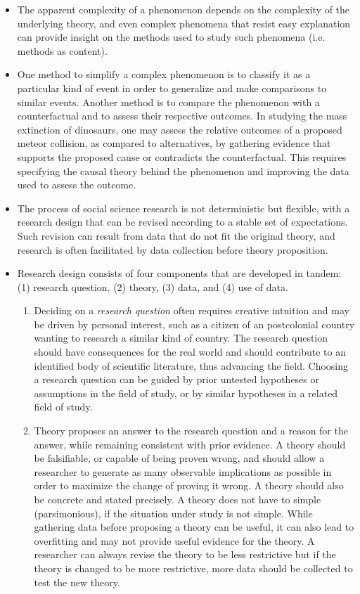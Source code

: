 \documentclass[11pt,letterpaper]{article}
\begin{document}
\begin{itemize}
\begin{enumerate}
\end{enumerate}
\item The apparent complexity of a phenomenon depends on the complexity of the underlying theory, and even complex phenomena that resist easy explanation can provide insight on the methods used to study such phenomena (i.e. methods as content). 
\item One method to simplify a complex phenomenon is to classify it as a particular kind of event in order to generalize and make comparisons to similar events. Another method is to compare the phenomenon with a counterfactual and to assess their respective outcomes. In studying the mass extinction of dinosaurs, one may assess the relative outcomes of a proposed meteor collision, as compared to alternatives, by gathering evidence that supports the proposed cause or contradicts the counterfactual. This requires specifying the causal theory behind the phenomenon and improving the data used to assess the outcome. 
\item The process of social science research is not deterministic but flexible, with a research design that can be revised according to a stable set of expectations. Such revision can result from data that do not fit the original theory, and research is often facilitated by data collection before theory proposition.
\item Research design consists of four components that are developed in tandem: (1) research question, (2) theory, (3) data, and (4) use of data.
\begin{enumerate}
\item Deciding on a \emph{research question} often requires creative intuition and may be driven by personal interest, such as a citizen of an postcolonial country wanting to research a similar kind of country. The research question should have consequences for the real world and should contribute to an identified body of scientific literature, thus advancing the field. Choosing a research question can be guided by prior untested hypotheses or assumptions in the field of study, or by similar hypotheses in a related field of study.
\item Theory proposes an answer to the research question and a reason for the answer, while remaining consistent with prior evidence. A theory should be falsifiable, or capable of being proven wrong, and should allow a researcher to generate as many observable implications as possible in order to maximize the change of proving it wrong. A theory should also be concrete and stated precisely. A theory does not have to simple (parsimonious), if the situation under study is not simple. While gathering data before proposing a theory can be useful, it can also lead to overfitting and may not provide useful evidence for the theory. A researcher can always revise the theory to be less restrictive but if the theory is changed to be more restrictive, more data should be collected to test the new theory.

\end{enumerate}
\end{itemize}
\end{document}
